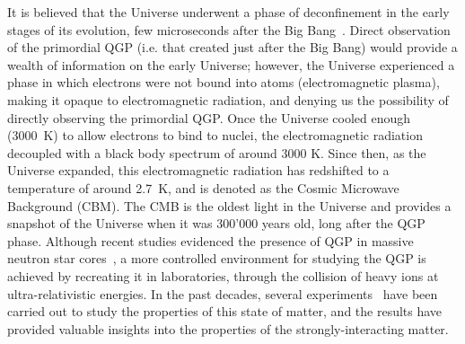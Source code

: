 It is believed that the Universe underwent a phase of deconfinement in the early stages of its evolution, few microseconds after the Big Bang~\cite{rafelski2014traveling}. Direct observation of the primordial QGP (i.e. that created just after the Big Bang) would provide a wealth of information on the early Universe; however, the Universe experienced a phase in which electrons were not bound into atoms (electromagnetic plasma), making it opaque to electromagnetic radiation, and denying us the possibility of directly observing the primordial QGP. Once the Universe cooled enough (3000~K) to allow electrons to bind to nuclei, the electromagnetic radiation decoupled with a black body spectrum of around 3000 K. Since then, as the Universe expanded, this electromagnetic radiation has redshifted to a temperature of around 2.7~K, and is denoted as the Cosmic Microwave Background (CBM). The CMB is the oldest light in the Universe and provides a snapshot of the Universe when it was 300'000 years old, long after the QGP phase. Although recent studies evidenced the presence of QGP in massive neutron star cores~\cite{Annala:2019puf}, a more controlled environment for studying the QGP is achieved by recreating it in laboratories, through the collision of heavy ions at ultra-relativistic energies. In the past decades, several experiments~\cite{ALICE:2022wpn, NA38:2000wlp, NA50:1997hlx, Nouicer:2009fy} have been carried out to study the properties of this state of matter, and the results have provided valuable insights into the properties of the strongly-interacting matter.

